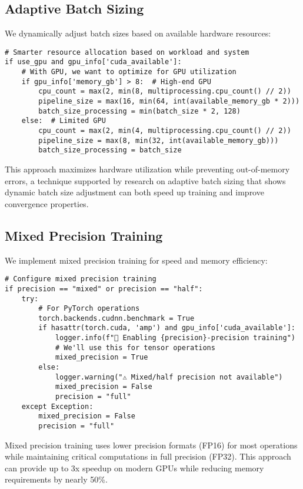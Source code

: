 \documentclass[12pt,a4paper]{article}
\begin{document}
\subsection{Adaptive Batch Sizing}

We dynamically adjust batch sizes based on available hardware resources:

\begin{verbatim}
# Smarter resource allocation based on workload and system
if use_gpu and gpu_info['cuda_available']:
    # With GPU, we want to optimize for GPU utilization
    if gpu_info['memory_gb'] > 8:  # High-end GPU
        cpu_count = max(2, min(8, multiprocessing.cpu_count() // 2))
        pipeline_size = max(16, min(64, int(available_memory_gb * 2)))
        batch_size_processing = min(batch_size * 2, 128)
    else:  # Limited GPU
        cpu_count = max(2, min(4, multiprocessing.cpu_count() // 2))
        pipeline_size = max(8, min(32, int(available_memory_gb)))
        batch_size_processing = batch_size
\end{verbatim}

This approach maximizes hardware utilization while preventing out-of-memory errors, a technique supported by research on adaptive batch sizing \cite{smith2017don} that shows dynamic batch size adjustment can both speed up training and improve convergence properties.

\subsection{Mixed Precision Training}

We implement mixed precision training for speed and memory efficiency:

\begin{verbatim}
# Configure mixed precision training
if precision == "mixed" or precision == "half":
    try:
        # For PyTorch operations
        torch.backends.cudnn.benchmark = True
        if hasattr(torch.cuda, 'amp') and gpu_info['cuda_available']:
            logger.info(f"🚀 Enabling {precision}-precision training")
            # We'll use this for tensor operations
            mixed_precision = True
        else:
            logger.warning("⚠️ Mixed/half precision not available")
            mixed_precision = False
            precision = "full"
    except Exception:
        mixed_precision = False
        precision = "full"
\end{verbatim}

Mixed precision training \cite{micikevicius2017mixed} uses lower precision formats (FP16) for most operations while maintaining critical computations in full precision (FP32). This approach can provide up to 3x speedup on modern GPUs while reducing memory requirements by nearly 50\%.
\end{document}
